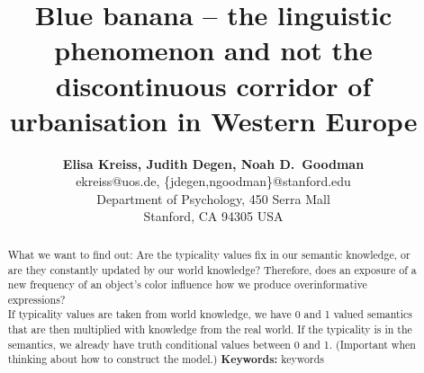 \documentclass[10pt,letterpaper]{article}
\title{Blue banana -- the linguistic phenomenon and not the discontinuous corridor of urbanisation in Western Europe}
\author{{\large \bf Elisa Kreiss, Judith Degen, Noah D.~Goodman} \\
  ekreiss@uos.de, \{jdegen,ngoodman\}@stanford.edu\\
  Department of Psychology, 450 Serra Mall \\
  Stanford, CA 94305 USA}
\begin{document}
\maketitle


\begin{abstract}

What we want to find out: Are the typicality values fix in our semantic knowledge, or are they constantly updated by our world knowledge? Therefore, does an exposure of a new frequency of an object’s color influence how we produce overinformative expressions? \\
If typicality values are taken from world knowledge, we have 0 and 1 valued semantics that are then multiplied with knowledge from the real world. If the typicality is in the semantics, we already have truth conditional values between 0 and 1. (Important when thinking about how to construct the model.)
\textbf{Keywords:} 
keywords
\end{abstract}

\end{document}
